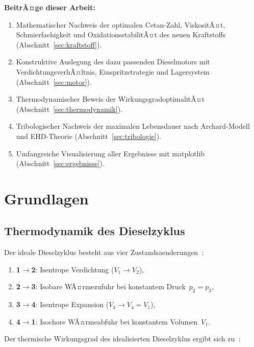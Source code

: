 ﻿\documentclass[12pt,a4paper]{article}
\begin{document}
\textbf{BeitrÃ¤ge dieser Arbeit:}
\begin{enumerate}[label=(\roman*)]
  \item Mathematischer Nachweis der optimalen Cetan-Zahl, ViskositÃ¤t,
        Schmierfaehigkeit und OxidationsstabilitÃ¤t des neuen Kraftstoffs
        (Abschnitt~\ref{sec:kraftstoff}).
  \item Konstruktive Auslegung des dazu passenden Dieselmotors mit
        VerdichtungsverhÃ¤ltnis, Einspritzstrategie und Lagersystem
        (Abschnitt~\ref{sec:motor}).
  \item Thermodynamischer Beweis der WirkungsgradoptimalitÃ¤t
        (Abschnitt~\ref{sec:thermodynamik}).
  \item Tribologischer Nachweis der maximalen Lebensdauer nach Archard-Modell
        und EHD-Theorie (Abschnitt~\ref{sec:tribologie}).
  \item Umfangreiche Visualisierung aller Ergebnisse mit matplotlib
        (Abschnitt~\ref{sec:ergebnisse}).
\end{enumerate}

\section{Grundlagen}
\label{sec:grundlagen}

\subsection{Thermodynamik des Dieselzyklus}
\label{sec:grundlagen_thermo}

Der ideale Dieselzyklus besteht aus vier Zustandsaenderungen~\cite{merker2014}:

\begin{enumerate}
  \item \textbf{1$\to$2}: Isentrope Verdichtung ($V_1 \to V_2$),
  \item \textbf{2$\to$3}: Isobare WÃ¤rmezufuhr bei konstantem Druck~$p_2 = p_3$,
  \item \textbf{3$\to$4}: Isentrope Expansion ($V_3 \to V_4 = V_1$),
  \item \textbf{4$\to$1}: Isochore WÃ¤rmeabfuhr bei konstantem Volumen~$V_1$.
\end{enumerate}

Der thermische Wirkungsgrad des idealisierten Dieselzyklus ergibt sich zu~\cite{cengel2014}:
\end{document}
